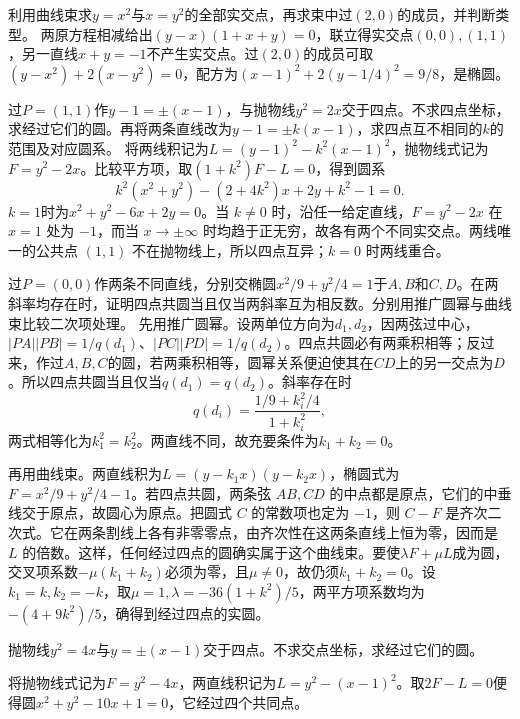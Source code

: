 利用曲线束求\(y=x^2\)与\(x=y^2\)的全部实交点，再求束中过\((2,0)\)的成员，并判断类型。
\solutionanswer
两原方程相减给出\((y-x)(1+x+y)=0\)，联立得实交点\((0,0),(1,1)\)，另一直线\(x+y=-1\)不产生实交点。过\((2,0)\)的成员可取\((y-x^2)+2(x-y^2)=0\)，配方为\((x-1)^2+2(y-1/4)^2=9/8\)，是椭圆。


过\(P=(1,1)\)作\(y-1=\pm(x-1)\)，与抛物线\(y^2=2x\)交于四点。不求四点坐标，求经过它们的圆。再将两条直线改为\(y-1=\pm k(x-1)\)，求四点互不相同的\(k\)的范围及对应圆系。
\solutionanswer
将两线积记为\(L=(y-1)^2-k^2(x-1)^2\)，抛物线式记为\(F=y^2-2x\)。比较平方项，取\((1+k^2)F-L=0\)，得到圆系
\[
k^2(x^2+y^2)-(2+4k^2)x+2y+k^2-1=0.
\]
\(k=1\)时为\(x^2+y^2-6x+2y=0\)。当 \(k\ne0\) 时，沿任一给定直线，\(F=y^2-2x\) 在 \(x=1\) 处为 \(-1\)，而当 \(x\to\pm\infty\) 时均趋于正无穷，故各有两个不同实交点。两线唯一的公共点 \((1,1)\) 不在抛物线上，所以四点互异；\(k=0\) 时两线重合。


过\(P=(0,0)\)作两条不同直线，分别交椭圆\(x^2/9+y^2/4=1\)于\(A,B\)和\(C,D\)。在两斜率均存在时，证明四点共圆当且仅当两斜率互为相反数。分别用推广圆幂与曲线束比较二次项处理。
\solutionanswer
先用推广圆幂。设两单位方向为\(d_1,d_2\)，因两弦过中心，\(|PA||PB|=1/q(d_1)\)、\(|PC||PD|=1/q(d_2)\)。四点共圆必有两乘积相等；反过来，作过\(A,B,C\)的圆，若两乘积相等，圆幂关系便迫使其在\(CD\)上的另一交点为\(D\)。所以四点共圆当且仅当\(q(d_1)=q(d_2)\)。斜率存在时
\[
 q(d_i)=\frac{1/9+k_i^2/4}{1+k_i^2},
\]
两式相等化为\(k_1^2=k_2^2\)。两直线不同，故充要条件为\(k_1+k_2=0\)。

再用曲线束。两直线积为\(L=(y-k_1x)(y-k_2x)\)，椭圆式为\(F=x^2/9+y^2/4-1\)。若四点共圆，两条弦 \(AB,CD\) 的中点都是原点，它们的中垂线交于原点，故圆心为原点。把圆式 \(C\) 的常数项也定为 \(-1\)，则 \(C-F\) 是齐次二次式。它在两条割线上各有非零零点，由齐次性在这两条直线上恒为零，因而是 \(L\) 的倍数。这样，任何经过四点的圆确实属于这个曲线束。要使\(\lambda F+\mu L\)成为圆，交叉项系数\(-\mu(k_1+k_2)\)必须为零，且\(\mu\ne0\)，故仍须\(k_1+k_2=0\)。设\(k_1=k,k_2=-k\)，取\(\mu=1,\lambda=-36(1+k^2)/5\)，两平方项系数均为\(-(4+9k^2)/5\)，确得到经过四点的实圆。


抛物线\(y^2=4x\)与\(y=\pm(x-1)\)交于四点。不求交点坐标，求经过它们的圆。
\par
\solutionanswer
将抛物线式记为\(F=y^2-4x\)，两直线积记为\(L=y^2-(x-1)^2\)。取\(2F-L=0\)便得圆\(x^2+y^2-10x+1=0\)，它经过四个共同点。


